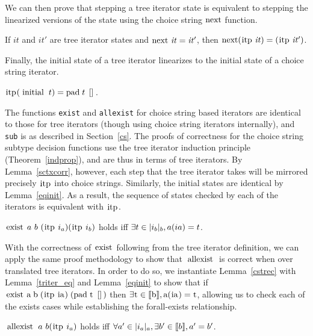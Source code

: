 \documentclass[a4paper,english]{lipics-v2019}
\newcommand{\denotes}[1]{\llbracket #1 \rrbracket}
\renewcommand{\c}[1]{\ensuremath{\text{\lstinline{#1}}}\xspace}
\begin{document}
\noindent
We can then prove that stepping a tree iterator state is equivalent to
stepping the linearized versions of the state using the choice string
\c{next} function.

\begin{lemma}\label{sctxcorr}
If $\mathit{it}$ and $\mathit{it'}$ are tree iterator states and
$\c{next}~\mathit{it}=\mathit{it}'$, then $\c{next} (\c{itp}\;\mathit{it}) =
(\c{itp}\;\mathit{it'})$.
\end{lemma}
\noindent
Finally, the initial state of a tree iterator linearizes to the
initial state of a choice string iterator.

\begin{lemma}\label{eqinit}
$\c{itp} (\c{initial}\;t) = \c{pad}\;t\;\c{[]}$.
\end{lemma}

\noindent
The functions \verb|exist| and \verb|allexist| for choice string based
iterators are identical to those for tree iterators (though using choice
string iterators internally), and \verb|sub| is as described in
Section~\ref{cs}. The proofs of correctness for the choice string subtype
decision functions use the tree iterator induction principle
(Theorem~\ref{indprop}), and are thus in terms of tree iterators. By
Lemma~\ref{sctxcorr}, however, each step that the tree iterator takes will be
mirrored precisely \c{itp} into choice strings. Similarly, the initial states
are identical by Lemma~\ref{eqinit}. As a result, the sequence of states
checked by each of the iterators is equivalent with \c{itp}.

\begin{lemma}\label{cstrec}
$\c{exist}~a~b~(\c{itp}~i_a) (\c{itp}~i_b)$ holds iff $\exists t \in
  |i_b|_{b}, a(ia)=t$.
\end{lemma}

With the correctness of \c{exist} following from the tree iterator definition,
we can apply the same proof methodology to show that \c{allexist} is correct
when over translated tree iterators. In order to do so, we instantiate
Lemma~\ref{cstrec}  with Lemma~\ref{triter_eq} and Lemma~\ref{eqinit} to show
that if $\c{exist}\;\c a\;\c b\;(\c{itp}\;\c{ia})\;(\c{pad}\;\c t\;\c{[]})$
then $\exists \c t \in \denotes{\c b}, \c a(\c{ia}) = \c t$, allowing us to check 
each of the exists cases while establishing the forall-exists relationship.

\begin{lemma}\label{cstraec}
$\c{allexist}~a~b (\c{itp}~i_a)$
 holds iff $\forall a'\in\irch{i_a}{a}, \exists b'\in\denotes{b},a'=b'$.
\end{lemma}
\end{document}
